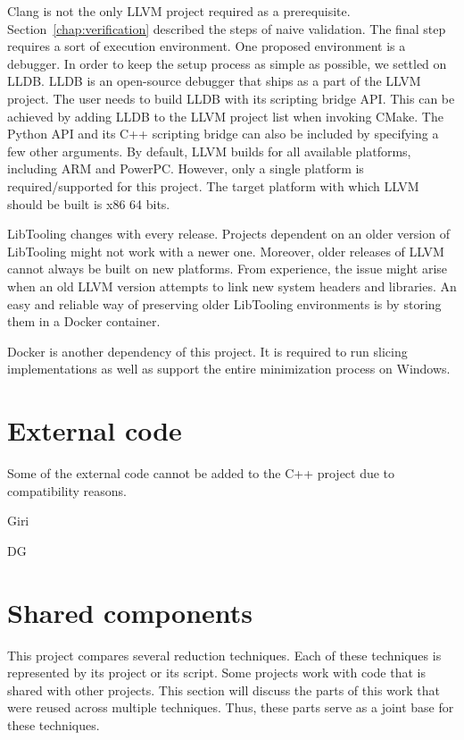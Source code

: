 Clang is not the only LLVM project required as a prerequisite.
Section~\ref{chap:verification} described the steps of naive validation. 
The final step requires a sort of execution environment. 
One proposed environment is a debugger. 
In order to keep the setup process as simple as possible, we settled on LLDB. 
LLDB is an open-source debugger that ships as a part of the LLVM project.
The user needs to build LLDB with its scripting bridge API.
This can be achieved by adding LLDB to the LLVM project list when invoking 
CMake.
The Python API and its C++ scripting bridge can also be included by 
specifying a few other arguments.
By default, LLVM builds for all available platforms, including ARM and 
PowerPC.
However, only a single platform is required/supported for this project.
The target platform with which LLVM should be built is x86 64 bits.

LibTooling changes with every release.
Projects dependent on an older version of LibTooling might not work with 
a newer one.
Moreover, older releases of LLVM cannot always be built on new platforms.
From experience, the issue might arise when an old LLVM version attempts 
to link new system headers and libraries.
An easy and reliable way of preserving older LibTooling environments is by 
storing them in a Docker container.

Docker is another dependency of this project.
It is required to run slicing implementations as well as support the entire 
minimization process on Windows.

\section{External code}

Some of the external code cannot be added to the C++ project due to 
compatibility reasons.

Giri

DG

\section{Shared components}

This project compares several reduction techniques.
Each of these techniques is represented by its project or its script.
Some projects work with code that is shared with other projects.
This section will discuss the parts of this work that were reused across 
multiple techniques.
Thus, these parts serve as a joint base for these techniques.

